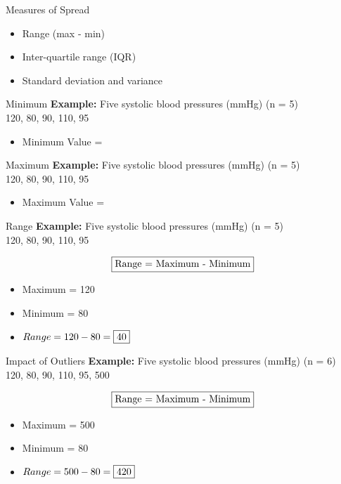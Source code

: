 \begin{frame}[t]{Measures of Spread}
	\begin{itemize}
		\item Range (max - min)
		\item Inter-quartile range (IQR)
		\item Standard deviation and variance
	\end{itemize}
\end{frame}

\begin{frame}[t]{Minimum}
\textbf{Example:}	Five systolic blood pressures (mmHg) (n = 5) \\
	120, 80, 90, 110, 95
	\begin{itemize}
		\item Minimum Value = 
	\end{itemize}
\end{frame}

\begin{frame}[t]{Maximum}
\textbf{Example:}	Five systolic blood pressures (mmHg) (n = 5) \\
	120, 80, 90, 110, 95
	\begin{itemize}
		\item Maximum Value = 
	\end{itemize}
\end{frame}

\begin{frame}[t]{Range}
 \textbf{Example:}	Five systolic blood pressures (mmHg) (n = 5) \\
	120, 80, 90, 110, 95
	
	$$
		\fbox{Range = Maximum - Minimum}
	$$ 
	
	\begin{itemize}
		\item Maximum = 120
		\item Minimum = 80 
		\item 	$
		Range = 120 - 80 = \fbox{40}
		$ 
	\end{itemize}

\end{frame}


\begin{frame}[t]{Impact of Outliers}
	\textbf{Example:}	Five systolic blood pressures (mmHg) (n = 6) \\
	120, 80, 90, 110, 95, 500
	
	$$
	\fbox{Range = Maximum - Minimum}
	$$ 
	
	\begin{itemize}
		\item Maximum = 500
		\item Minimum = 80 
		\item 	$
		Range = 500 - 80 = \fbox{420}
		$ 
	\end{itemize}
\end{frame}


